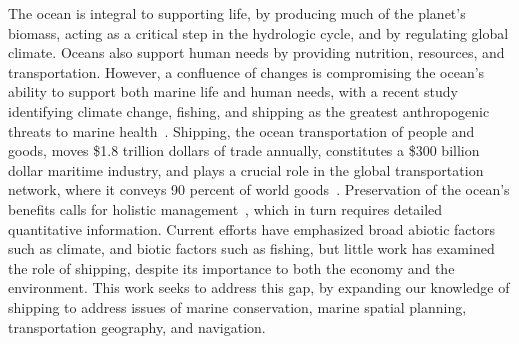 


The ocean is integral to supporting life, by producing much of the planet's biomass, acting as a critical step in the hydrologic cycle, and by regulating global climate. Oceans also support human needs by providing nutrition, resources, and transportation. However, a confluence of changes is compromising the ocean's ability to support both marine life and human needs, with a recent study identifying climate change, fishing, and shipping as the greatest anthropogenic threats to marine health~\citep{Halpern2008}.  Shipping, the ocean transportation of people and goods, moves \$1.8 trillion dollars of trade annually, constitutes a \$300 billion dollar maritime industry, and plays a crucial role in the global transportation network, where it conveys 90 percent of world goods~\citep{oced2010,Rodrigue2009}. Preservation of the ocean's benefits calls for holistic management~\citep{Lubchenco2010}, which in turn requires detailed quantitative information. Current efforts have emphasized broad abiotic factors such as climate, and biotic factors such as fishing, but little work has examined the role of shipping, despite its importance to both the economy and the environment. This work seeks to address this gap, by expanding our knowledge of shipping to address issues of marine conservation, marine spatial planning, transportation geography, and navigation.


